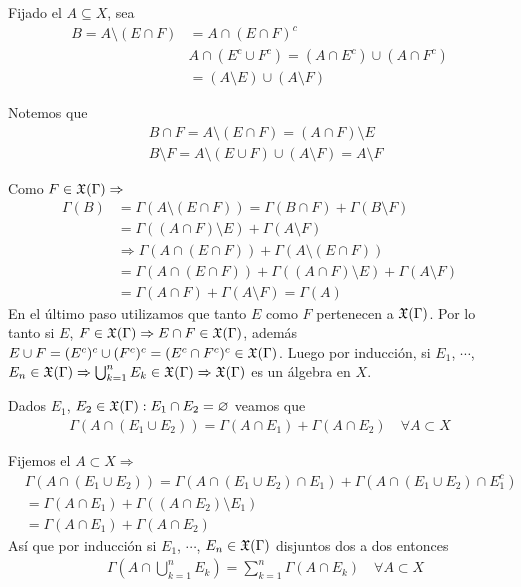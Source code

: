 Fijado el $A \subseteq X$, sea \begin{align*}
    B = A \setminus (E \cap F) & = A \cap (E \cap F)^c                                  \\
                               & A \cap (E^c \cup F^c) = (A \cap E^c) \cup (A \cap F^c) \\
                               & = (A \setminus E) \cup (A \setminus F)
\end{align*}

Notemos que \begin{align*}
     & B \cap F = A \setminus (E \cap F) = (A \cap F) \setminus E                  \\
     & B \setminus F = A \setminus (E \cup F) \cup (A \setminus F) = A \setminus F
\end{align*}

Como $F \in \mathfrak{X}(\Gamma) \Rightarrow$ \begin{align*}
    \Gamma(B) & = \Gamma(A \setminus (E \cap F)) = \Gamma(B \cap F) + \Gamma(B \setminus F)          \\
              & = \Gamma((A \cap F) \setminus E) + \Gamma(A \setminus F)                             \\
              & \Rightarrow \Gamma(A \cap (E \cap F)) + \Gamma(A \setminus (E \cap F))               \\
              & = \Gamma(A \cap (E \cap F)) + \Gamma((A \cap F) \setminus E) + \Gamma(A \setminus F) \\
              & = \Gamma(A \cap F) + \Gamma(A \setminus F) = \Gamma(A)
\end{align*}
En el último paso utilizamos que tanto $E$ como $F$ pertenecen a $\mathfrak{X}(\Gamma)$.
Por lo tanto si $E$, $F \in \mathfrak{X}(\Gamma) \Rightarrow E \cap F \in \mathfrak{X}(\Gamma)$, además $E \cup F = (E^c)^c \cup (F^c)^c = (E^c \cap F^c)^c \in \mathfrak{X}(\Gamma)$.
Luego por inducción, si $E_1$, $\cdots$, $E_n \in \mathfrak{X}(\Gamma) \Rightarrow \bigcup_{k = 1}^n E_k \in \mathfrak{X}(\Gamma) \Rightarrow \mathfrak{X}(\Gamma)$ es un álgebra en $X$.

Dados $E_1$, $E_2 \in \mathfrak{X}(\Gamma) : E_1 \cap E_2 = \varnothing$ veamos que \begin{align*}
    \Gamma(A \cap (E_1 \cup E_2)) = \Gamma(A \cap E_1) + \Gamma(A \cap E_2) \quad \forall A \subset X
\end{align*}

Fijemos el $A \subset X \Rightarrow$ \begin{align*}
     & \Gamma(A \cap (E_1 \cup E_2)) = \Gamma(A \cap (E_1 \cup E_2) \cap E_1) + \Gamma(A \cap (E_1 \cup E_2) \cap E_1^c) \\
     & = \Gamma(A \cap E_1) + \Gamma((A \cap E_2) \setminus E_1)                                                         \\
     & = \Gamma(A \cap E_1) + \Gamma(A \cap E_2)
\end{align*}
Así que por inducción si $E_1$, $\cdots$, $E_n \in \mathfrak{X}(\Gamma)$ disjuntos dos a dos entonces \begin{align*}
     & \Gamma\left( A \cap \bigcup_{k = 1}^n E_k \right) = \sum_{k = 1}^n \Gamma(A \cap E_k) \quad \forall A \subset X
\end{align*}

